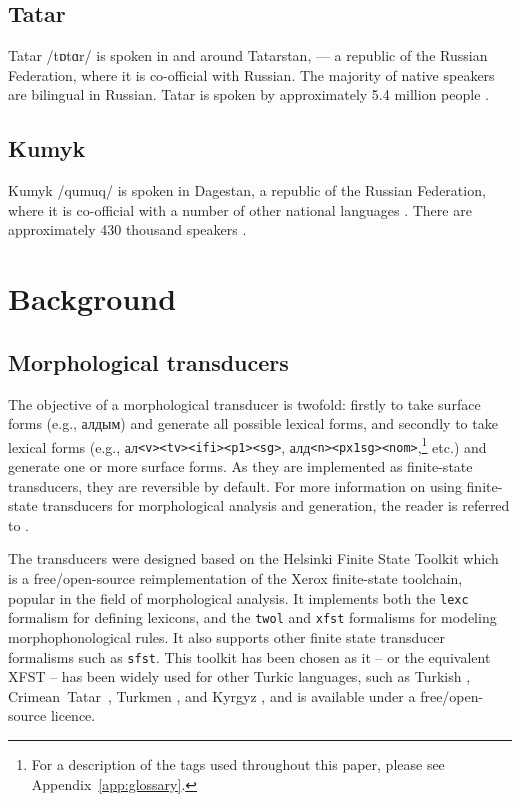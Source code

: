 \documentclass[a4paper,11pt,twocolumn]{article}
\begin{document}

\subsection{Tatar}
Tatar /t{\symbl ɒ}t{\symbl ɑ}r/ is spoken in and around Tatarstan, --- a republic of the Russian Federation, where it is co-official with Russian. The majority of native speakers are bilingual in Russian. Tatar is spoken by approximately 5.4 million people \citep{ethnologue}.   %

\subsection{Kumyk}
Kumyk /qumuq/ is spoken in Dagestan, a republic of the Russian Federation, where it is co-official with a number of other national languages \citep{ethnologue}.  There are approximately 430 thousand speakers \citep{ethnologue}.

\section{Background}\label{sec:bg}
\subsection{Morphological transducers}
The objective of a morphological transducer is twofold: firstly to take surface forms (e.g., алдым) and generate all possible lexical forms, and secondly to take lexical forms (e.g.,  ал{\tt {\small <v><tv><ifi><p1><sg>}}, алд{\tt {\small <n><px1sg><nom>}},\footnote{For a description of the tags used throughout this paper, please see Appendix~\ref{app:glossary}.} etc.) and generate one or more surface forms.  As they are implemented as finite-state transducers, they are reversible by default. For more information on using finite-state transducers for morphological analysis and generation, the reader is referred to \cite{beesley2003}.

The transducers were designed based on the Helsinki Finite State Toolkit \citep{hfst/2011} which is a free/open-source reimplementation of the Xerox finite-state toolchain, popular in the field of morphological analysis.  It implements both the \texttt{lexc} formalism for defining lexicons, and the \texttt{twol} and \texttt{xfst} formalisms for modeling morphophonological rules.  It also supports other finite state transducer formalisms such as \texttt{sfst}.  This toolkit has been chosen as it -- or the equivalent XFST \cite{beesley2003} -- has been widely used for other Turkic languages, such as Turkish \citep{coltekin2010}, Crimean~Tatar~\citep{altintas2001}, Turkmen \citep{tantug2006}, and Kyrgyz \citep{washington2012}, and is available under a free/open-source licence.
\end{document}
